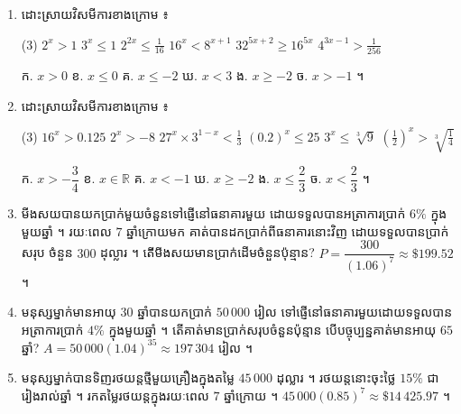 \begin{enumerate}[1]
\begin{tasks}
    \task $3^{(3^x)} = 1$
    \task $\left(\sqrt{2 + \sqrt{3}}\right)^x + \left(\sqrt{2 - \sqrt{3}}\right)^x = 4$
  \end{tasks}
  \ans
  ក. $x = 5$ \quad ខ. $x \in \{0, 1, 3\}$ (គោល $x + 1 = 1$ ឬនិទស្សន្ត $x^2 - 4x + 3 = 0$) \quad គ. $x = 0$ (ព្រោះ $(2 - \sqrt{3})(2 + \sqrt{3}) = 1$ នាំឱ្យ $t + \frac{1}{t} = 2$, $t = 1$) \quad ឃ. $2^x = 8$, $x = 3$ \quad ង. $3^{4\cdot 4^x} = 3^2$, $4^x = \frac{1}{2}$, $x = -\frac{1}{2}$ \quad ច. ចែកនឹង $9^x$ ហើយតាង $t = \left(\frac{2}{3}\right)^x$ ៖ $3t^2 - 5t + 2 = 0$, $t = 1$ ឬ $t = \frac{2}{3}$ ដូច្នេះ $x = 0$ ឬ $x = 1$ \quad ឆ. $3^x = 0$ គ្មានចម្លើយ \quad ជ. $t + \frac{1}{t} = 4$ ដែល $t = \left(\sqrt{2 + \sqrt{3}}\right)^x$ ៖ $t = 2 \pm \sqrt{3}$ ដូច្នេះ $x = \pm 2$ ។
  \item ដោះស្រាយវិសមីការខាងក្រោម ៖
  \begin{tasks}(3)
    \task $2^x > 1$
    \task $3^x \le 1$
    \task $2^{2x} \le \frac{1}{16}$
    \task $16^x < 8^{x+1}$
    \task $32^{5x+2} \ge 16^{5x}$
    \task $4^{3x-1} > \frac{1}{256}$
  \end{tasks}
  \ans
  ក. $x > 0$ \quad ខ. $x \le 0$ \quad គ. $x \le -2$ \quad ឃ. $x < 3$ \quad ង. $x \ge -2$ \quad ច. $x > -1$ ។
  \item ដោះស្រាយវិសមីការខាងក្រោម ៖
  \begin{tasks}(3)
    \task $16^x > 0.125$
    \task $2^x > -8$
    \task $27^x\times 3^{1-x} < \frac{1}{3}$
    \task $(0.2)^x \le 25$
    \task $3^x \le \sqrt[3]{9}$
    \task $\left(\frac{1}{2}\right)^x > \sqrt[3]{\frac{1}{4}}$
  \end{tasks}
  \ans
  ក. $x > -\dfrac{3}{4}$ \quad ខ. $x \in \mathbb{R}$ \quad គ. $x < -1$ \quad ឃ. $x \ge -2$ \quad ង. $x \le \dfrac{2}{3}$ \quad ច. $x < \dfrac{2}{3}$ ។
  \item មីងសយបានយកប្រាក់មួយចំនួនទៅផ្ញើនៅធនាគារមួយ ដោយទទួលបានអត្រាការប្រាក់ $6\%$ ក្នុងមួយឆ្នាំ ។ រយៈពេល $7$ ឆ្នាំក្រោយមក គាត់បានដកប្រាក់ពីធនាគារនោះវិញ ដោយទទួលបានប្រាក់សរុប ចំនួន $300$ ដុល្លារ ។ តើមីងសយមានប្រាក់ដើមចំនួនប៉ុន្មាន?
  \ans
  $P = \dfrac{300}{(1.06)^7} \approx \$199.52$ ។
  \item មនុស្សម្នាក់មានអាយុ $30$ ឆ្នាំបានយកប្រាក់ $50\,000$ រៀល ទៅផ្ញើនៅធនាគារមួយដោយទទួលបានអត្រាការប្រាក់ $4\%$ ក្នុងមួយឆ្នាំ ។ តើគាត់មានប្រាក់សរុបចំនួនប៉ុន្មាន បើបច្ចុប្បន្នគាត់មានអាយុ $65$ ឆ្នាំ?
  \ans
  $A = 50\,000(1.04)^{35} \approx 197\,304$ រៀល ។
  \item មនុស្សម្នាក់បានទិញរថយន្តថ្មីមួយគ្រឿងក្នុងតម្លៃ $45\,000$ ដុល្លារ ។ រថយន្តនោះចុះថ្លៃ $15\%$ ជារៀងរាល់ឆ្នាំ ។ រកតម្លៃរថយន្តក្នុងរយៈពេល $7$ ឆ្នាំក្រោយ ។
  \ans
  $45\,000(0.85)^7 \approx \$14\,425.97$ ។
\end{enumerate}
